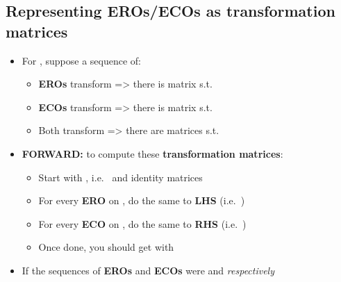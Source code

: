 \subsection*{Representing EROs/ECOs as transformation
  matrices}

\begin{itemize}

  \item
        For , suppose a sequence of:

        \begin{itemize}

          \item
                \textbf{EROs} transform
                 =>
                there is matrix  s.t. 
          \item
                \textbf{ECOs} transform
                 =>
                there is matrix  s.t. 
          \item
                Both transform
                => there are matrices  s.t. 
        \end{itemize}
  \item
        \textbf{FORWARD:} to compute these \textbf{transformation matrices}:

        \begin{itemize}

          \item
                Start with \iMbox{[I_{m} \ | \ A \ | \ I_{n}]}, i.e.~ and
                identity matrices
          \item
                For every \textbf{ERO} on , do the same to \textbf{LHS}
                (i.e.~)
          \item
                For every \textbf{ECO} on , do the same to \textbf{RHS}
                (i.e.~)
          \item
                Once done, you should get
                \iMbox{\ds [I_{m} \ | \ A \ | \ I_{n}] \rightsquigarrow [R \ | \ A' \ | \ C]}
                with 
        \end{itemize}
  \item
        If the sequences of \textbf{EROs} and \textbf{ECOs} were
         and
         \emph{respectively}


\end{itemize}
